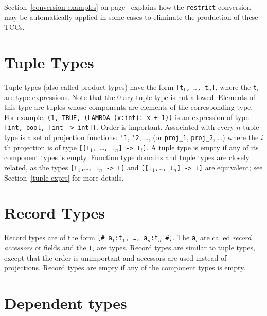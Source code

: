 Section~\ref{conversion-examples} on page~\pageref{conversion-examples}
explains how the \texttt{restrict} conversion may be automatically applied
in some cases to eliminate the production of these TCCs.



\section{Tuple Types}\label{tuple-types}

Tuple types (also called product types) have the form {\tt [t$_1$, \ldots,
t$_n$]}, where the {\tt t$_i$} are type expressions.  Note that the 0-ary
tuple type is not allowed.  Elements of this type are tuples whose
components are elements of the corresponding type.  For example, {\tt (1,
TRUE, (LAMBDA (x:int): x + 1))} is an expression of type {\tt [int, bool,
[int -> int]]}.  Order is important.  Associated with every $n$-tuple type
is a set of projection functions: \texttt{`1}, \texttt{`2}, \ldots, (or
{\tt proj\_1}, \texttt{proj\_2}, \ldots) where the $i$th projection is of
type {\tt [[t$_1$, \ldots, t$_n$] -> t$_i$]}.  A tuple type is empty if
any of its component types is empty.  Function type domains and tuple
types are closely related, as the types {\tt [t$_1$,\ldots, t$_n$ -> t]}
and {\tt [[t$_1$,\ldots, t$_n$] -> t]} are equivalent; see
Section~\ref{tuple-exprs} for more details.


\section{Record Types}\label{record-types}

Record types are of the form {\tt [\# a$_1$:t$_1$, \ldots, a$_n$:t$_n$
\#]}.  The {\tt a$_i$} are called \emph{record accessors} or fields and the {\tt t$_i$} are types.  Record types are
similar to tuple types, except that the order is unimportant and accessors
are used instead of projections.  Record types are empty if any of the
component types is empty.


\section{Dependent types}\label{dependent-types}

